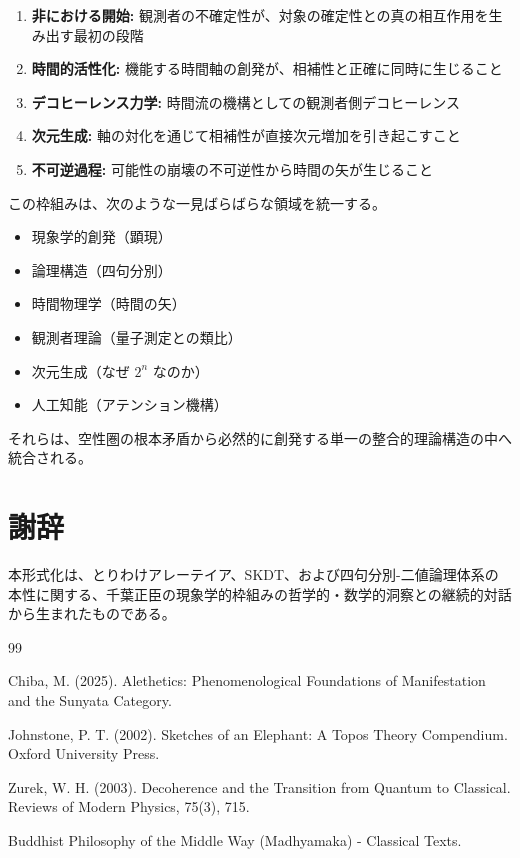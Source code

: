 \documentclass[12pt,a4paper]{article}
\theoremstyle{definition}
\begin{document}
\begin{enumerate}
    \item \textbf{非における開始:} 観測者の不確定性が、対象の確定性との真の相互作用を生み出す最初の段階
    
    \item \textbf{時間的活性化:} 機能する時間軸の創発が、相補性と正確に同時に生じること
    
    \item \textbf{デコヒーレンス力学:} 時間流の機構としての観測者側デコヒーレンス
    
    \item \textbf{次元生成:} 軸の対化を通じて相補性が直接次元増加を引き起こすこと
    
    \item \textbf{不可逆過程:} 可能性の崩壊の不可逆性から時間の矢が生じること
\end{enumerate}

この枠組みは、次のような一見ばらばらな領域を統一する。
\begin{itemize}
    \item 現象学的創発（顕現）
    \item 論理構造（四句分別）
    \item 時間物理学（時間の矢）
    \item 観測者理論（量子測定との類比）
    \item 次元生成（なぜ $2^n$ なのか）
    \item 人工知能（アテンション機構）
\end{itemize}

それらは、空性圏の根本矛盾から必然的に創発する単一の整合的理論構造の中へ統合される。

\section*{謝辞}

本形式化は、とりわけアレーテイア、SKDT、および四句分別-二値論理体系の本性に関する、千葉正臣の現象学的枠組みの哲学的・数学的洞察との継続的対話から生まれたものである。

\begin{thebibliography}{99}

 Chiba, M. (2025). Alethetics: Phenomenological Foundations of Manifestation and the Sunyata Category.

 Johnstone, P. T. (2002). Sketches of an Elephant: A Topos Theory Compendium. Oxford University Press.

 Zurek, W. H. (2003). Decoherence and the Transition from Quantum to Classical. Reviews of Modern Physics, 75(3), 715.

 Buddhist Philosophy of the Middle Way (Madhyamaka) - Classical Texts.

\end{thebibliography}
\end{document}
